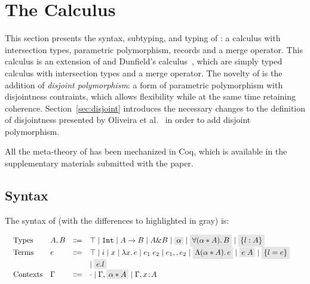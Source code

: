 \section{The \name Calculus}
\label{sec:fi}

This section presents the syntax, subtyping, and typing of \name: 
a calculus with intersection types, parametric polymorphism, records and a merge operator. 
This calculus is an extension of \oldname and Dunfield's
calculus~\cite{dunfield2014elaborating}, which are simply typed
calculus with intersection types and a merge operator.
The novelty of \name is the addition of \emph{disjoint polymorphism}:
a form of parametric polymorphism with disjointness contraints, which
allows flexibility while at the same time retaining coherence. 
Section~\ref{sec:disjoint} introduces the necessary changes to the
definition of disjointness presented by Oliveira et al.~\cite{} in
order to add disjoint polymorphism.

All the meta-theory of \name has been mechanized in Coq, which is available in
the supplementary materials submitted with the paper.

\subsection{Syntax}

The syntax of \name (with the differences to \oldname highlighted in gray) is: 

\vspace{-15pt}
  \[
    \begin{array}{l}
      \begin{array}{llrll}
        \text{Types}
        & A, B & \Coloneqq & \top \mid \tyint \mid A \to B \mid A
                             \inter B \mid \highlight{$\alpha$} \mid \highlight{$\fordis \alpha A B$} \mid \highlight{$\recordType l A$} & \\ 

        \text{Terms}
        & e & \Coloneqq & \top \mid i \mid x \mid \lamty x A e \mid \app {e_1} {e_2} 
              \mid e_1 \mergeop e_2 \mid \highlight{$\blamdis \alpha A e$} \mid \highlight{$\tapp e A$} \mid 
              \highlight{$\recordCon l e$} \\ 
        &   &           &\mid \highlight{$\recordProj e l$} & \\
        \text{Contexts}
        & \Gamma & \Coloneqq & \cdot
                   \mid \Gamma, \highlight{$\alpha \disjoint A$}
                   \mid \Gamma, x \oftype A  & \\
      \end{array}
    \end{array}
  \]

